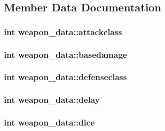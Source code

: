 \subsection{Member Data Documentation}
\hypertarget{structweapon__data_acdadb390593000d5561a33bd839125ef}{
\subsubsection[{attackclass}]{\setlength{\rightskip}{0pt plus 5cm}int weapon\-\_\-data\-::attackclass}}\label{structweapon__data_acdadb390593000d5561a33bd839125ef}
\hypertarget{structweapon__data_a333138cf76af6771957bfff26075f126}{
\subsubsection[{basedamage}]{\setlength{\rightskip}{0pt plus 5cm}int weapon\-\_\-data\-::basedamage}}\label{structweapon__data_a333138cf76af6771957bfff26075f126}
\hypertarget{structweapon__data_aea968a5cc4ec4dc3d554ef789e58da69}{
\subsubsection[{defenseclass}]{\setlength{\rightskip}{0pt plus 5cm}int weapon\-\_\-data\-::defenseclass}}\label{structweapon__data_aea968a5cc4ec4dc3d554ef789e58da69}
\hypertarget{structweapon__data_ab646699ef54c800842741b89f72b6280}{
\subsubsection[{delay}]{\setlength{\rightskip}{0pt plus 5cm}int weapon\-\_\-data\-::delay}}\label{structweapon__data_ab646699ef54c800842741b89f72b6280}
\hypertarget{structweapon__data_a9aff2202aa2b4c62d81ca16eb2d7d1a6}{
\subsubsection[{dice}]{\setlength{\rightskip}{0pt plus 5cm}int weapon\-\_\-data\-::dice}}\label{structweapon__data_a9aff2202aa2b4c62d81ca16eb2d7d1a6}
